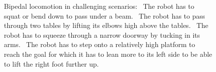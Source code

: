 \documentclass{article}
\begin{document}
\begin{figure}[t]%
  \centering%
  \caption{%
    Bipedal locomotion in challenging scenarios: 
  ~The robot has to squat or bend down to pass under a beam.
  ~The robot has to pass through two tables by lifting its elbows high above the tables.
  ~The robot has to squeeze through a narrow doorway by tucking in its arms.
  ~The robot has to step onto a relatively high platform to reach the goal for which it has to lean more to its left side to be able to lift the right foot further up.
  }%
  \label{fig:biped_locomotion}%
  \vspace{-3.5mm}
\end{figure}
\end{document}
